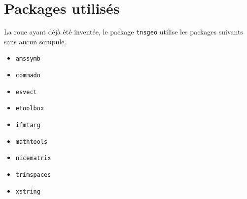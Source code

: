 \documentclass[12pt,a4paper]{article}
\begin{document}
\section{Packages utilisés}

La roue ayant déjà été inventée, le package \verb#tnsgeo# utilise les packages suivants sans aucun scrupule.

\begin{multicols}{4}
    \begin{itemize}
        \item \verb#amssymb#
        \item \verb#commado#
        \item \verb#esvect#
        \item \verb#etoolbox#
        \item \verb#ifmtarg#
        \item \verb#mathtools#
        \item \verb#nicematrix#
        \item \verb#trimspaces#
        \item \verb#xstring#
    \end{itemize}
\end{multicols}
\end{document}
